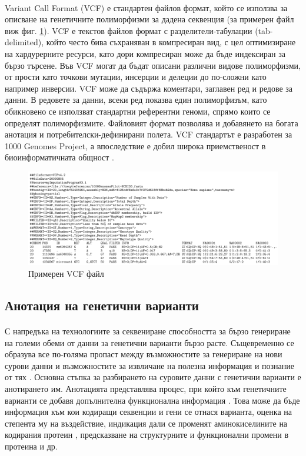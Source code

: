 \documentclass[pdftex,cyrillic,14pt,a4page,twoside,openright]{extreport}
\begin{document}
\paragraph{}
Variant Call Format (VCF) е стандартен файлов формат, който се използва за описване на генетичните полиморфизми за дадена секвенция (за примерен файл виж фиг. \ref{fig:example_vcf}). VCF е текстов файлов формат с разделители-табулации (tab-delimited), който често бива съхраняван в компресиран вид, с цел оптимизиране на хардурерните ресурси, като дори компресиран може да бъде индексиран за бързо търсене. Във VCF могат да бъдат описани различни видове полиморфизми, от прости като точкови мутации, инсерции и делеции до по-сложни като например инверсии. VCF може да съдържа коментари, заглавен ред и редове за данни. В редовете за данни, всеки ред показва един полиморфизъм, като обикновено се използват стандартни референтни геноми, спрямо които се определят полиморфизмите. Файловият формат позволява и добавянето на богата анотация и потребителски-дефинирани полета. VCF стандартът е разработен за 1000 Genomes Project, а впоследствие е добил широка приемственост в биоинформатичната общност \cite{danecek2011}.

\begin{figure}[h]
  \centering
  \includegraphics[width=17cm]{figures/vcf}
  \caption {Примерен VCF файл}
  \label{fig:example_vcf}
\end{figure}


\subsection{Анотация на генетични варианти}
\paragraph{}
С напредъка на технологиите за секвениране способността за бързо генериране на големи обеми от данни за генетични варианти бързо расте. Същевременно се образува все по-голяма пропаст между възможностите за генериране на нови сурови данни и възможностите за извличане на полезна информация и познание от тях \cite{yang2015}. Основна стъпка за разбирането на суровите данни с генетични варианти е анотирането им. Анотацията представлява процес, при който към генетичните варианти се добавя допълнителна функционална информация \cite{mccarthy2014}. Това може да бъде информация към кои кодиращи секвенции и гени се отнася варианта, оценка на степента му на въздействие, индикация дали се променят аминокиселините на кодирания протеин \cite{cingolani2012}, предсказване на структурните и функционални промени в протеина \cite{mccarthy2014} и др.
\end{document}
